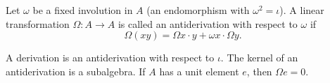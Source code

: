 Let $\omega$ be a fixed involution in $A$ (an endomorphism with $\omega^2 = \iota$). A linear transformation $\Omega: A \to A$ is called an antiderivation with respect to $\omega$ if
$$\Omega(xy) = \Omega x \cdot y + \omega x \cdot \Omega y.$$

A derivation is an antiderivation with respect to $\iota$. The kernel of an antiderivation is a subalgebra. If $A$ has a unit element $e$, then $\Omega e = 0$.
